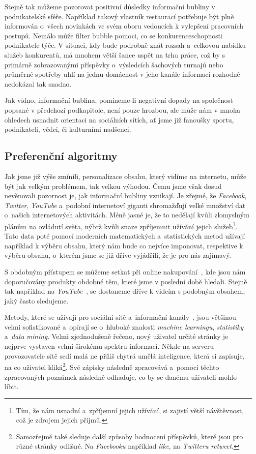 \documentclass[12pt, a4paper]{article}
\numberwithin{equation}{section} 	%
\begin{document}
Stejně tak můžeme pozorovat positivní důsledky informační bubliny v podnikatelské sféře. Například takový vlastník restaurací potřebuje být plně informován o~všech novinkách ve svém oboru vedoucích k vylepšení pracovních postupů. Nemálo může filter bubble pomoci, co se konkurenceschopnosti podnikatele týče. V situaci, kdy bude podrobně znát rozsah a~celkovou nabídku služeb konkurentů, má mnohem větší šance uspět na trhu práce, což by s primárně zobrazovanými příspěvky o~výsledcích šachových turnajů nebo průměrné spotřeby uhlí na jednu domácnost v jeho kanále informací rozhodně nedokázal tak snadno.

Jak vidno, informační bublina, pomineme-li negativní dopady na společnost popsané v předchozí podkapitole, není pouze hrozbou, ale může nám v mnoha ohledech usnadnit orientaci na sociálních sítích, ať jsme již fanoušky sportu, podnikateli, vědci, či kulturními nadšenci.

\subsection{Preferenční algoritmy}
\noindent Jak jsme již výše zmínili, personalizace obsahu, který vidíme na internetu, může být jak velkým problémem, tak velkou výhodou. Čemu jsme však dosud nevěnovali pozornost je, jak informační bubliny vznikají. Je zřejmé, že \textit{Facebook}, \textit{Twitter}, \textit{YouTube} a~podobní internetoví giganti shromažďují velké množství dat o~našich internetových aktivitách. Méně jasné je, že to nedělají kvůli zlomyslným plánům na ovládutí světa, nýbrž kvůli snaze zpříjemnit užívání jejich služeb\footnote{Tím, že nám usnadní a~zpříjemní jejich užívání, si zajistí větší návštěvnost, což je zdrojem jejich příjmů.}. Tato data poté pomocí moderních matematických a~statistických metod užívají například k výběru obsahu, který nám bude co nejvíce imponovat, respektive k výběru obsahu, o~kterém jsme se již dříve vyjádřili, že je pro nás zajímavý.

S obdobným přístupem se můžeme setkat při online nakupování~\cite{Amazon}, kde jsou nám doporučovány produkty obdobné těm, které jsme v poslední době hledali. Stejně tak například na \textit{YouTube}~\cite{YouTube}, se dostaneme dříve k videím s podobným obsahem, jaký často sledujeme.

Metody, které se užívají pro sociální sítě a~informační kanály~\cite{TwitterRecomendation}, jsou většinou velmi sofistikované a~opírají se o~hluboké znalosti \textit{machine learningu}, \textit{statistiky} a~\textit{data mining}. Velmi zjednodušeně řečeno, nový uživatel určité stránky je nejprve vystaven velmi širokému spektru informací. Někde na serveru provozovatele sítě sedí malá ne příliš chytrá umělá inteligence, která si zapisuje, na co uživatel kliká\footnote{Samozřejmě také sleduje další způsoby hodnocení příspěvků, které jsou pro různé stránky odlišné. Na \textit{Facebooku} například \textit{like}, na \textit{Twitteru} \textit{retweet}.}. Své zápisky následně zpracovává a~pomocí těchto zpracovaných poznámek následně odhaduje, co by se danému uživateli mohlo líbit.
\end{document}
